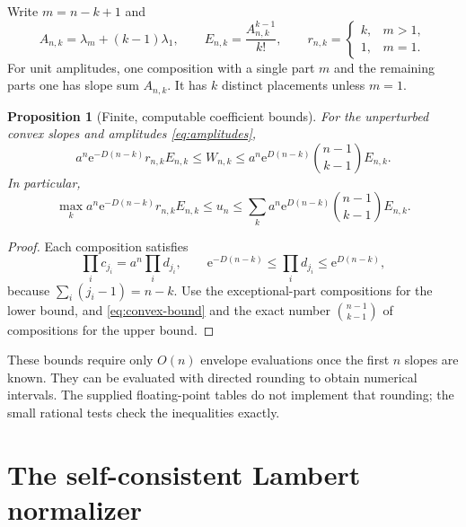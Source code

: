 \documentclass[11pt,a4paper]{article}
\numberwithin{equation}{section}
\newtheorem{proposition}[theorem]{Proposition}
\theoremstyle{definition}
\theoremstyle{remark}
\newcommand{\ee}{\mathrm e}
\begin{document}
Write $m=n-k+1$ and
\begin{equation}
 A_{n,k}=\lambda_m+(k-1)\lambda_1,\qquad
 E_{n,k}=\frac{A_{n,k}^{k-1}}{k!},\qquad
 r_{n,k}=\begin{cases}k,&m>1,\\1,&m=1.\end{cases}
 \label{eq:finite-envelopes}
\end{equation}
For unit amplitudes, one composition with a single part $m$ and the
remaining parts one has slope sum $A_{n,k}$. It has $k$ distinct
placements unless $m=1$.

\begin{proposition}[Finite, computable coefficient bounds]
\label{prop:finite-bounds}
For the unperturbed convex slopes and amplitudes
\eqref{eq:amplitudes},
\begin{equation}
 a^n\ee^{-D(n-k)}r_{n,k}E_{n,k}
 \le W_{n,k}\le
 a^n\ee^{D(n-k)}\binom{n-1}{k-1}E_{n,k}.
 \label{eq:finite-W-bound}
\end{equation}
In particular,
\begin{equation}
 \max_k a^n\ee^{-D(n-k)}r_{n,k}E_{n,k}
 \le u_n\le
 \sum_k a^n\ee^{D(n-k)}\binom{n-1}{k-1}E_{n,k}.
 \label{eq:finite-u-bound}
\end{equation}
\end{proposition}
\begin{proof}
Each composition satisfies
\[
 \prod_i c_{j_i}=a^n\prod_i d_{j_i},\qquad
 \ee^{-D(n-k)}\le\prod_i d_{j_i}\le\ee^{D(n-k)},
\]
because $\sum_i(j_i-1)=n-k$. Use the exceptional-part compositions for
the lower bound, and \eqref{eq:convex-bound} and the exact number
$\binom{n-1}{k-1}$ of compositions for the upper bound.
\end{proof}

These bounds require only $O(n)$ envelope evaluations once the first $n$
slopes are known. They can be evaluated with directed rounding to obtain
numerical intervals. The supplied floating-point tables do not implement
that rounding; the small rational tests check the inequalities exactly.

\section{The self-consistent Lambert normalizer}
\label{sec:normalizer}
\end{document}
